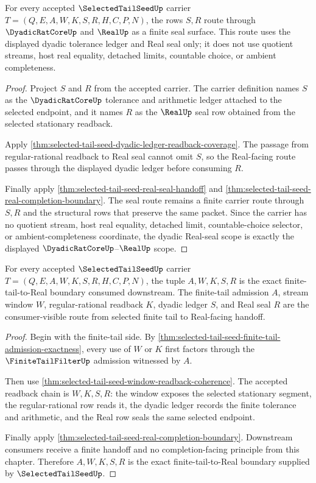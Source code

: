 \begin{theorem}
\label{thm:selected-tail-seed-dyadic-real-seal-scope}
For every accepted $\SelectedTailSeedUp$ carrier $T=(Q,E,A,W,K,S,R,H,C,P,N)$, the rows $S,R$ route through $\DyadicRatCoreUp$ and $\RealUp$ as a finite seal surface. This route uses the displayed dyadic tolerance ledger and Real seal only; it does not use quotient streams, host real equality, detached limits, countable choice, or ambient completeness.
\end{theorem}
\begin{proof}
Project $S$ and $R$ from the accepted carrier. The carrier definition names $S$ as the $\DyadicRatCoreUp$ tolerance and arithmetic ledger attached to the selected endpoint, and it names $R$ as the $\RealUp$ seal row obtained from the selected stationary readback.

Apply \autoref{thm:selected-tail-seed-dyadic-ledger-readback-coverage}. The passage from regular-rational readback to Real seal cannot omit $S$, so the Real-facing route passes through the displayed dyadic ledger before consuming $R$.

Finally apply \autoref{thm:selected-tail-seed-real-seal-handoff} and \autoref{thm:selected-tail-seed-real-completion-boundary}. The seal route remains a finite carrier route through $S,R$ and the structural rows that preserve the same packet. Since the carrier has no quotient stream, host real equality, detached limit, countable-choice selector, or ambient-completeness coordinate, the dyadic Real-seal scope is exactly the displayed $\DyadicRatCoreUp$--$\RealUp$ scope.
\end{proof}

\begin{theorem}
\label{thm:selected-tail-seed-finite-tail-real-boundary-scope}
For every accepted $\SelectedTailSeedUp$ carrier $T=(Q,E,A,W,K,S,R,H,C,P,N)$, the tuple $A,W,K,S,R$ is the exact finite-tail-to-Real boundary consumed downstream. The finite-tail admission $A$, stream window $W$, regular-rational readback $K$, dyadic ledger $S$, and Real seal $R$ are the consumer-visible route from selected finite tail to Real-facing handoff.
\end{theorem}
\begin{proof}
Begin with the finite-tail side. By \autoref{thm:selected-tail-seed-finite-tail-admission-exactness}, every use of $W$ or $K$ first factors through the $\FiniteTailFilterUp$ admission witnessed by $A$.

Then use \autoref{thm:selected-tail-seed-window-readback-coherence}. The accepted readback chain is $W,K,S,R$: the window exposes the selected stationary segment, the regular-rational row reads it, the dyadic ledger records the finite tolerance and arithmetic, and the Real row seals the same selected endpoint.

Finally apply \autoref{thm:selected-tail-seed-real-completion-boundary}. Downstream consumers receive a finite handoff and no completion-facing principle from this chapter. Therefore $A,W,K,S,R$ is the exact finite-tail-to-Real boundary supplied by $\SelectedTailSeedUp$.
\end{proof}


